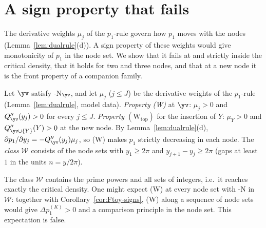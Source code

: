 \section{A sign property that fails}\label{sec:W}\label{ssec:W}

The derivative weights $\mu_j$ of the $p_1$-rule govern how $p_1$ moves with the nodes (Lemma~\ref{lem:dualrule}(d)). A sign
property of these weights would give monotonicity of $p_1$ in the node set. We show that it fails at and strictly inside the
critical density, that it holds for two and three nodes, and that at a new node it is the front property of a companion
family.

\begin{definition}\label{def:W}
Let $\yv$ satisfy \hyp{N}$_{\yv}$, and let $\mu_j$ ($j\le J$) be the derivative weights of the $p_1$-rule
(Lemma~\ref{lem:dualrule}, model data). \emph{Property \textup{(W)}} at $\yv$: $\mu_j>0$ and $Q''_{\yv}(y_j)>0$ for every
$j\le J$. \emph{Property $(\mathrm W_{\mathrm{top}})$} for the insertion of $Y$: $\mu_Y>0$ and
$Q''_{\yv\cup\{Y\}}(Y)>0$ at the new node. By Lemma~\ref{lem:dualrule}(d), $\partial p_1/\partial y_j=-Q''_{\yv}(y_j)\mu_j$,
so \textup{(W)} makes $p_1$ strictly decreasing in each node. The \emph{class} $\mathcal W$ consists of the node sets with
$y_1\ge2\pi$ and $y_{j+1}-y_j\ge2\pi$ (gaps at least $1$ in the units $n=y/2\pi$).
\end{definition}

The class $\mathcal W$ contains the prime powers and all sets of integers, i.e.\ it reaches exactly the critical density.
One might expect (W) at every node set with \hyp{N} in $\mathcal W$: together with Corollary~\ref{cor:Ftoy-signs}, (W) along a
sequence of node sets would give $\Delta p_1^{(K)}>0$ and a comparison principle in the node set. This expectation is
false.

